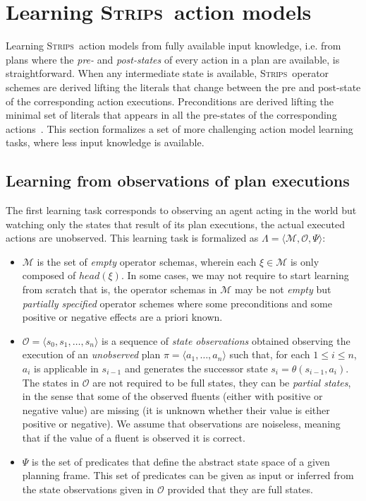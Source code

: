 \documentclass[3p,times]{elsarticle}
\newcommand{\strips}{\textsc{Strips}}     %
\newcommand{\tup}[1]{{\langle #1 \rangle}}
\begin{document}
\section{Learning \strips\ action models}
\label{sec:Section4}
Learning \strips\ action models from fully available input knowledge, i.e. from plans where the {\em pre-} and {\em post-states} of every action in a plan are available, is straightforward. When any intermediate state is available, \strips\ operator schemes are derived lifting the literals that change between the pre and post-state of the corresponding action executions. Preconditions are derived lifting the minimal set of literals that appears in all the pre-states of the corresponding actions~\cite{jimenez2012review}. This section formalizes a set of more challenging action model learning tasks, where less input knowledge is available.

\subsection{Learning from observations of plan executions}

The first learning task corresponds to observing an agent acting in the world but watching only the states that result of its plan executions, the actual executed actions are unobserved. This learning task is formalized as $\Lambda=\tup{\mathcal{M},\mathcal{O},\Psi}$:
\begin{itemize}
\item $\mathcal{M}$ is the set of {\em empty} operator schemas, wherein each $\xi\in\mathcal{M}$ is only composed of $head(\xi)$. In some cases, we may not require to start learning from scratch that is, the operator schemas in $\mathcal{M}$ may be not {\em empty} but {\em partially specified} operator schemes where some preconditions and some positive or negative effects are a priori known.
\item $\mathcal{O}=\tup{s_0,s_1,\ldots,s_{n}}$ is a sequence of {\em state observations} obtained observing the execution of an {\em unobserved} plan $\pi=\tup{a_1, \ldots, a_n}$ such that, for each {\small $1\leq i\leq n$}, $a_i$ is applicable in $s_{i-1}$ and generates the successor state $s_i=\theta(s_{i-1},a_i)$. The states in $\mathcal{O}$ are not required to be full states, they can be {\em partial states}, in the sense that some of the observed fluents (either with positive or negative value) are missing (it is unknown whether their value is either positive or negative). We assume that observations are noiseless, meaning that if the value of a fluent is observed it is correct.
\item $\Psi$ is the set of predicates that define the abstract state space of a given planning frame. This set of predicates can be given as input or inferred from the state observations given in $\mathcal{O}$ provided that they are full states.
\end{itemize}
\end{document}
